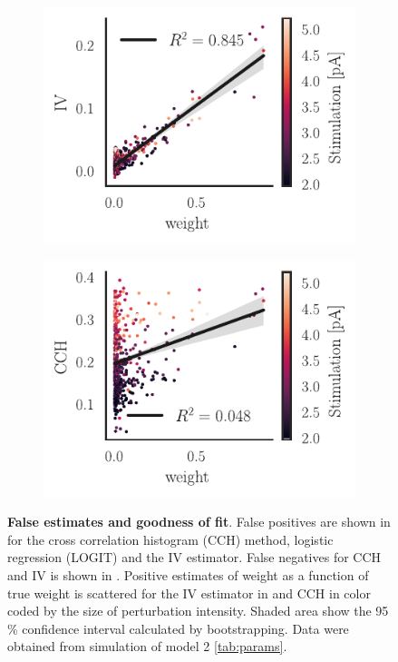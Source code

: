 \documentclass[11pt]{article}
\begin{document}
\begin{figure}
\medskip
\begin{subfigure}{0.46\textwidth} \includegraphics[scale=1]{fit_wald}
\caption{} \label{fig:network-class:3}
\end{subfigure}\hfill
\begin{subfigure}{0.6\textwidth} \includegraphics[scale=1]{fit_cch}
\caption{} \label{fig:network-class:4}
\end{subfigure}
\caption{{\bf False estimates and goodness of fit}. False positives are shown in  for the cross correlation histogram (CCH) method, logistic regression (LOGIT) and the IV estimator. False negatives for CCH and IV is shown in . Positive estimates of weight as a function of true weight is scattered for the IV estimator in  and CCH in  color coded by the size of perturbation intensity. Shaded area show the 95 \% confidence interval calculated by bootstrapping. Data were obtained from simulation of model 2 \cref{tab:params}.
\label{fig:network-class}}
\end{figure}
\FloatBarrier
\end{document}
